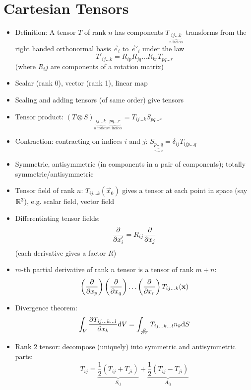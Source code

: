 \section{Cartesian Tensors}
\begin{itemize}
      \item Definition: A tensor $T$ of rank $n$ has components $T_{\underbrace{ij\dots k}_{n \text{ indices}}}$ transforms from the right handed orthonormal basis ${\vec{e}_i}$ to ${\vec{e}'_i}$ under the law \[T'_{ij\dots k} = R_{ip}R_{jq}\dots R_{kr} T_{pq\dots r}\] (where $R_ij$ are components of a rotation matrix)
      \item Scalar (rank 0), vector (rank 1), linear map
      \item Scaling and adding tensors (of same order) give tensors
      \item Tensor product: $(T \otimes S)_{\underbrace{ij\dots k}_{n \text{ indices}}\underbrace{pq\dots r}_{m \text{ indices}}} = T_{ij\dots k}S_{pq\dots r}$
      \item Contraction: contracting on indices $i$ and $j$: $S_{\underbrace{p \dots q}_{n-2}} = \delta_{ij} T_{ijp \dots q}$
      \item Symmetric, antisymmetric (in components in a pair of components); totally symmetric/antisymmetric
      \item Tensor field of rank $n$: $T_{ij\dots k}(\vec{x}_0)$ gives a tensor at each point in space (say $\mathbb{R}^3$), e.g. scalar field, vector field
      \item Differentiating tensor fields: \[ \frac{\partial}{\partial{x_i'}} = R_{ij} \frac{\partial}{\partial{x_j}}\] (each derivative gives a factor $R$)
      \item $m$-th partial derivative of rank $n$ tensor is a tensor of rank $m+n$: \[ \left( \frac{\partial}{\partial{x_p}} \right) \left( \frac{\partial}{\partial{x_q}} \right) \dots \left( \frac{\partial}{\partial{x_r}} \right) T_{ij \dots k}(\boldsymbol{\mathbf{x}}) \]
      \item Divergence theorem: \[ \int_V \frac{\partial{T_{ij \dots k \dots l}}}{\partial{x_k}} \mathrm{d} V = \int_{\frac{\partial}{\partial{V}}} T_{ij \dots k \dots l} n_k \mathrm{d} S \]
      \item Rank 2 tensor: decompose (uniquely) into symmetric and antisymmetric parts:
            \[T_{ij} = \underbrace{\frac{1}{2}(T_{ij} + T_{ji})}_{S_{ij}} + \underbrace{\frac{1}{2}(T_{ij} - T_{ji})}_{A_{ij}} \]


\end{itemize}
